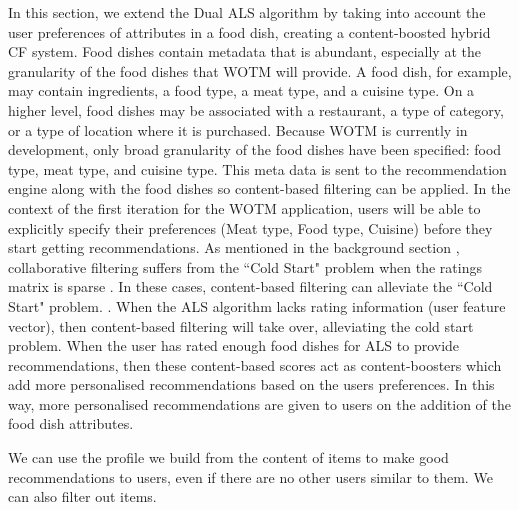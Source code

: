 In this section, we extend the Dual ALS algorithm by taking into account the user preferences of attributes in a food dish, creating a content-boosted hybrid CF system. Food dishes contain metadata that is abundant, especially at the granularity of the food dishes that WOTM will provide. A food dish, for example, may contain ingredients, a food type, a meat type, and a cuisine type. On a higher level, food dishes may be associated with a restaurant, a type of category, or a type of location where it is purchased. Because WOTM is currently in development, only broad granularity of the food dishes have been specified: food type, meat type, and cuisine type. This meta data is sent to the recommendation engine along with the food dishes so content-based filtering can be applied. In the context of the first iteration for the WOTM application, users will be able to explicitly specify their preferences (Meat type, Food type, Cuisine) before they start getting recommendations. As mentioned in the background section , collaborative filtering suffers from the ``Cold Start" problem when the ratings matrix is sparse . In these cases, content-based filtering can alleviate the ``Cold Start" problem. . When the ALS algorithm lacks rating information (user feature vector), then content-based filtering will take over, alleviating the cold start problem. When the user has rated enough food dishes for ALS to provide recommendations, then these content-based scores act as content-boosters which add more personalised recommendations based on the users preferences. In this way, more personalised recommendations are given to users on the addition of the food dish attributes.


\todo{}
 We can use the profile we build from the content
of items to make good recommendations to
users, even if there are no other users similar to
them. We can also filter out items.



